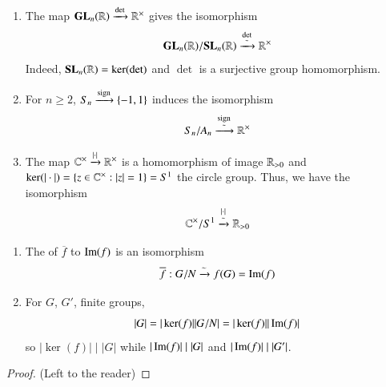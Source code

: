 \documentclass[12pt, a4paper, oneside, openright, titlepage]{book}
\begin{document}
\begin{eg}
        \leavevmode
        \begin{enumerate}
                \item The map $\mathbf{GL}_n(\mathbb R)\xrightarrow{\det}\mathbb R^{\times}$ gives the isomorphism \begin{equation}
                                \mathbf{GL}_n(\mathbb R)/\mathbf{SL}_n(\mathbb R)\xrightarrow{\underset{\sim}{\det}}\mathbb R^{\times}
                \end{equation}
                        Indeed, $\mathbf{SL}_n(\mathbb R) = \ker(\det)$ and $\det$ is a surjective group homomorphism.
                \item For $n\geq 2$, $S_n\xrightarrow{\operatorname{sign}}\{-1,1\}$ induces the isomorphism \begin{equation}
                                S_n/A_n \xrightarrow{\underset{\sim}{\operatorname{sign}}}\mathbb R^{\times}
                \end{equation}
                \item The map $\mathbb C^{\times} \xrightarrow{|\cdot|}\mathbb R^{\times}$ is a homomorphism of image $\mathbb R_{>0}$ and $\ker(|\cdot |) = \{z \in \mathbb C^{\times}:|z| = 1\} = S^1$ the circle group. Thus, we have the isomorphism \begin{equation}
                                \mathbb C^{\times}/S^1 \xrightarrow{\underset{\sim}{|\cdot|}}\mathbb R_{>0}
                \end{equation}
        \end{enumerate}
\end{eg}


\begin{cor}
        \leavevmode
        \begin{enumerate}
                \item The  of $\overline{f}$ to $\operatorname{Im}(f)$ is an isomorphism \begin{equation}
                                \overline{f}:G/N\xrightarrow{\sim}f(G) = \operatorname{Im}(f)
                \end{equation}
                \item For $G$, $G'$, finite groups, \begin{equation}
                                |G| = |\ker(f)||G/N| = |\ker(f)||\operatorname{Im}(f)|
                \end{equation}
                        so $|\ker(f)|\;\vert\;|G|$ while $|\operatorname{Im}(f)|\;\vert\;|G|$ and $|\operatorname{Im}(f)|\;\vert\;|G'|$.
        \end{enumerate}
\end{cor}
\begin{proof}
        (Left to the reader)
\end{proof}
\end{document}
